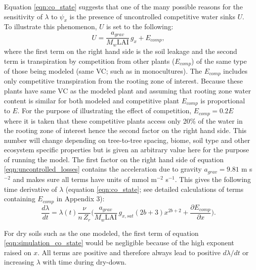 \documentclass[utf8]{frontiersSCNS} %
\begin{document}
Equation \ref{eqn:co_state} suggests that one of the many possible reasons for the sensitivity of $\lambda$ to $\psi_x$ is the presence of uncontrolled competitive water sinks $U$. To illustrate this phenomenon, $U$ is set to the following:
\begin{equation}
    U = \frac{a_{grav}}{M_w \text{LAI}} \, g_x + E_{comp},
    \label{eqn:uncontrolled_losses}
\end{equation}
where the first term on the right hand side is the soil leakage and the second term is transpiration by competition from other plants ($E_{comp}$) of the same type of those being modeled (same VC; such as in monocultures). The $E_{comp}$ includes only competitive transpiration from the rooting zone of interest. Because these plants have same VC as the modeled plant and assuming that rooting zone water content is similar for both modeled and competitive plant $E_{comp}$ is proportional to $E$. For the purpose of illustrating the effect of competition, $E_{comp} = 0.2 E$ where it is taken that these competitive plants access only 20\% of the water in the rooting zone of interest hence the second factor on the right hand side. This number will change depending on tree-to-tree spacing, biome, soil type and other ecosystem specific properties but is given an arbitrary value here for the purpose of running the model. The first factor on the right hand side of equation \ref{eqn:uncontrolled_losses} contains the acceleration due to gravity $a_{grav} = 9.81$ m s$^{-2}$ and makes sure all terms have units of mmol m$^{-2}$ s$^{-1}$. This gives the following time derivative of $\lambda$ (equation \ref{eqn:co_state}; see detailed calculations of terms containing $E_{comp}$ in Appendix 3):
\begin{equation}
        \frac{d\lambda}{dt} = \lambda(t) \frac{\nu}{n\, Z_r} \Bigg( \frac{a_{grav}}{M_w \text{LAI}}\, g_{x,sat} (2b+3) x^{2b+2} + \frac{\partial E_{comp}}{\partial x} \Bigg).
    \label{eqn:simulation_co_state}
\end{equation}

For dry soils such as the one modeled, the first term of equation \ref{eqn:simulation_co_state} would be negligible because of the high exponent raised on $x$. All terms are positive and therefore always lead to positive $d\lambda/dt$ or increasing $\lambda$ with time during dry-down.
\end{document}

